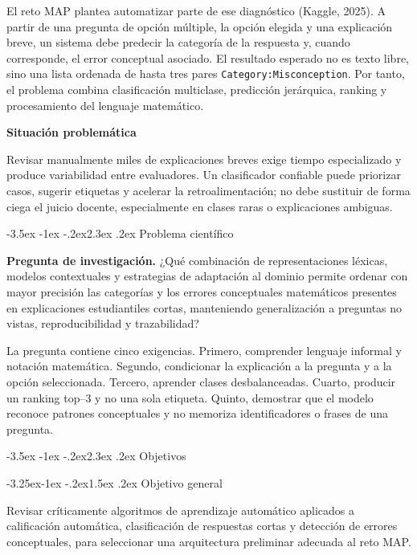 \documentclass[11pt,oneside,openany]{book}
\makeatletter
\renewcommand\section{\@startsection{section}{1}{\z@}%
  {-3.5ex \@plus -1ex \@minus -.2ex}{2.3ex \@plus .2ex}%
  {\normalfont\Large\sffamily\bfseries\color{AzulMedio}}}
\renewcommand\subsection{\@startsection{subsection}{2}{\z@}%
  {-3.25ex\@plus -1ex \@minus -.2ex}{1.5ex \@plus .2ex}%
  {\normalfont\large\sffamily\bfseries\color{TurquesaOscuro}}}
\newenvironment{hallazgo}[1][]{%
  \begin{lrbox}{\infobox}\begin{minipage}{0.92\textwidth}
  \color{GrisTexto}\sffamily\textbf{#1}\par\smallskip\rmfamily}
  {\end{minipage}\end{lrbox}\par\medskip\noindent
   \colorbox{CelesteClaro}{\usebox{\infobox}}\par\medskip}
\newcommand{\codigo}[1]{\texttt{#1}}
\makeatother
\begin{document}
El reto MAP plantea automatizar parte de ese diagnóstico (Kaggle, 2025). A partir de una
pregunta de opción múltiple, la opción elegida y una explicación breve, un sistema
debe predecir la categoría de la respuesta y, cuando corresponde, el error
conceptual asociado. El resultado esperado no es texto libre, sino una lista
ordenada de hasta tres pares \codigo{Category:Misconception}. Por tanto, el
problema combina clasificación multiclase, predicción jerárquica, ranking y
procesamiento del lenguaje matemático.

\begin{hallazgo}[Situación problemática]
Revisar manualmente miles de explicaciones breves exige tiempo especializado y
produce variabilidad entre evaluadores. Un clasificador confiable puede priorizar
casos, sugerir etiquetas y acelerar la retroalimentación; no debe sustituir de
forma ciega el juicio docente, especialmente en clases raras o explicaciones
ambiguas.
\end{hallazgo}

\section{Problema científico}

\textbf{Pregunta de investigación.} ¿Qué combinación de representaciones léxicas,
modelos contextuales y estrategias de adaptación al dominio permite ordenar con
mayor precisión las categorías y los errores conceptuales matemáticos presentes
en explicaciones estudiantiles cortas, manteniendo generalización a preguntas no
vistas, reproducibilidad y trazabilidad?

La pregunta contiene cinco exigencias. Primero, comprender lenguaje informal y
notación matemática. Segundo, condicionar la explicación a la pregunta y a la
opción seleccionada. Tercero, aprender clases desbalanceadas. Cuarto, producir un
ranking top--3 y no una sola etiqueta. Quinto, demostrar que el modelo reconoce
patrones conceptuales y no memoriza identificadores o frases de una pregunta.

\section{Objetivos}

\subsection{Objetivo general}

Revisar críticamente algoritmos de aprendizaje automático aplicados a calificación
automática, clasificación de respuestas cortas y detección de errores conceptuales,
para seleccionar una arquitectura preliminar adecuada al reto MAP.
\end{document}

